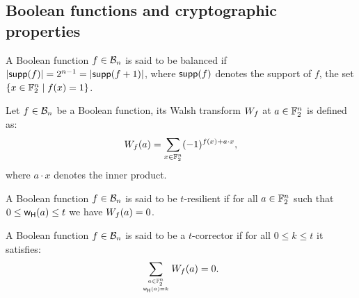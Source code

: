 \documentclass[11pt]{llncs}
\begin{document}




\subsection{Boolean functions and cryptographic properties}

\begin{definition}[Balancedness]\label{def:balancedness}
	A Boolean function $f\in \mathcal{B}_{n}$ is said to be balanced if $|\mathsf{supp}(f)|=2^{n-1}=|\mathsf{supp}(f+1)|$, where $\mathsf{supp}(f)$ denotes the support of $f$, the set $\{x\in \mathbb{F}_2^n \mid f(x)=1\}$.
\end{definition}


\begin{definition}\label{def:walsh_transform}
	Let $f\in \mathcal{B}_{n}$ be a Boolean function, its Walsh transform $W_{f}$ at $a \in \mathbb{F}_2^n$ is defined as:
	\[  W_{f} (a) = \sum_{x \in \mathbb{F}_2^n} (-1)^{f(x) +  a \cdot x },\]
	where $a \cdot x$ denotes the inner product.
\end{definition}

\begin{definition}[Resilience]\label{def:res}
	A Boolean function $f\in \mathcal{B}_{n}$ is said to be $t$-resilient if for all $a\in \mathbb{F}_2^n$ such that $0\le \mathsf{w_H}(a)\le t$ we have $W_{f}(a)=0$.
\end{definition}

\begin{definition}[Corrector]\label{def:corr}
	A Boolean function $f\in \mathcal{B}_{n}$ is said to be a $t$-corrector if for all $0\le k \le t$ it satisfies:
	\[\sum_{a\in \mathbb{F}_2^n \atop{\mathsf{w_H}(a)=k}} W_{f}(a)=0.\]
\end{definition}
\end{document}
